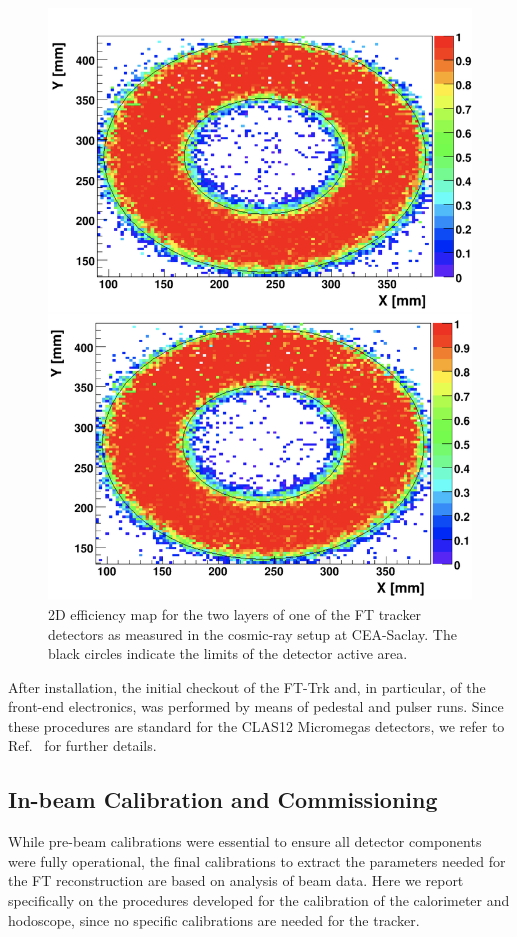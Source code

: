 \begin{figure}[htb]
 \includegraphics[width=0.9\columnwidth,keepaspectratio]{fig/fttrk_cosmic.png}
 \caption{2D efficiency map for the two layers of one of the FT tracker detectors as measured in the cosmic-ray
   setup at CEA-Saclay. The black circles indicate the limits of the detector active area.}
 \label{fig:ftt_cosmic}
\end{figure}

After installation, the initial checkout of the FT-Trk and, in particular, of the front-end electronics, was performed
by means of pedestal and pulser runs. Since these procedures are standard for the CLAS12 Micromegas detectors,
we refer to Ref.~\cite{mm} for further details.

\subsection{In-beam Calibration and Commissioning}

While pre-beam calibrations were essential to ensure all detector components were fully operational, the final
calibrations to extract the parameters needed for the FT reconstruction are based on analysis of beam data.
Here we report specifically on the procedures developed for the calibration of the calorimeter and hodoscope,
since no specific calibrations are needed for the tracker.

